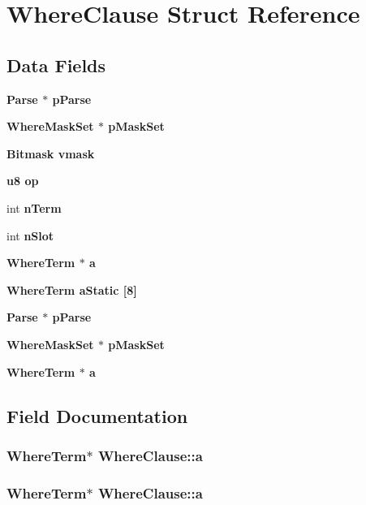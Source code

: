 \section{Where\-Clause Struct Reference}
\label{structWhereClause}
\subsection*{Data Fields}
\begin{CompactItemize}
\item 
\bf{Parse} $\ast$ \bf{p\-Parse}
\item 
\bf{Where\-Mask\-Set} $\ast$ \bf{p\-Mask\-Set}
\item 
\bf{Bitmask} \bf{vmask}
\item 
\bf{u8} \bf{op}
\item 
int \bf{n\-Term}
\item 
int \bf{n\-Slot}
\item 
\bf{Where\-Term} $\ast$ \bf{a}
\item 
\bf{Where\-Term} \bf{a\-Static} [8]
\item 
\bf{Parse} $\ast$ \bf{p\-Parse}
\item 
\bf{Where\-Mask\-Set} $\ast$ \bf{p\-Mask\-Set}
\item 
\bf{Where\-Term} $\ast$ \bf{a}
\end{CompactItemize}


\subsection{Field Documentation}
\subsubsection{\setlength{\rightskip}{0pt plus 5cm}\bf{Where\-Term}$\ast$ \bf{Where\-Clause::a}}\label{structWhereClause_bb53a5189107162de44c87fe4a3a0fbf}


\subsubsection{\setlength{\rightskip}{0pt plus 5cm}\bf{Where\-Term}$\ast$ \bf{Where\-Clause::a}}\label{structWhereClause_bb53a5189107162de44c87fe4a3a0fbf}


